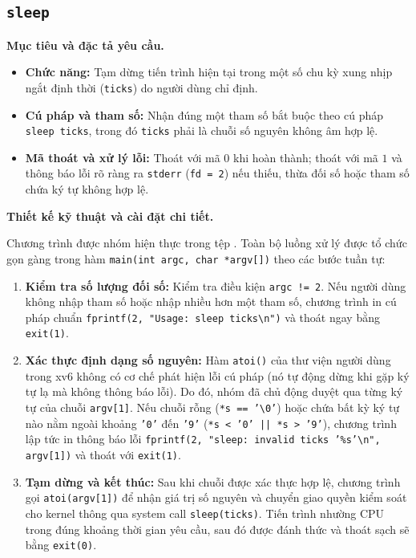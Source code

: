 \documentclass[12pt,a4paper]{article}
\begin{document}
\subsection{\texttt{sleep}}

\textbf{Mục tiêu và đặc tả yêu cầu.}
\begin{itemize}
  \item \textbf{Chức năng:} Tạm dừng tiến trình hiện tại trong một số chu kỳ xung nhịp ngắt định thời (\texttt{ticks}) do người dùng chỉ định.
  \item \textbf{Cú pháp và tham số:} Nhận đúng một tham số bắt buộc theo cú pháp \texttt{sleep ticks}, trong đó \texttt{ticks} phải là chuỗi số nguyên không âm hợp lệ.
  \item \textbf{Mã thoát và xử lý lỗi:} Thoát với mã $0$ khi hoàn thành; thoát với mã $1$ và thông báo lỗi rõ ràng ra \texttt{stderr} (\texttt{fd = 2}) nếu thiếu, thừa đối số hoặc tham số chứa ký tự không hợp lệ.
\end{itemize}

\textbf{Thiết kế kỹ thuật và cài đặt chi tiết.}

Chương trình được nhóm hiện thực trong tệp . Toàn bộ luồng xử lý được tổ chức gọn gàng trong hàm \texttt{main(int argc, char *argv[])} theo các bước tuần tự:
\begin{enumerate}
  \item \textbf{Kiểm tra số lượng đối số:} Kiểm tra điều kiện \texttt{argc != 2}. Nếu người dùng không nhập tham số hoặc nhập nhiều hơn một tham số, chương trình in cú pháp chuẩn \texttt{fprintf(2, "Usage: sleep ticks\textbackslash n")} và thoát ngay bằng \texttt{exit(1)}.
  \item \textbf{Xác thực định dạng số nguyên:} Hàm \texttt{atoi()} của thư viện người dùng trong xv6 không có cơ chế phát hiện lỗi cú pháp (nó tự động dừng khi gặp ký tự lạ mà không thông báo lỗi). Do đó, nhóm đã chủ động duyệt qua từng ký tự của chuỗi \texttt{argv[1]}. Nếu chuỗi rỗng (\texttt{*s == '\textbackslash 0'}) hoặc chứa bất kỳ ký tự nào nằm ngoài khoảng \texttt{'0'} đến \texttt{'9'} (\texttt{*s < '0' || *s > '9'}), chương trình lập tức in thông báo lỗi \texttt{fprintf(2, "sleep: invalid ticks '\%s'\textbackslash n", argv[1])} và thoát với \texttt{exit(1)}.
  \item \textbf{Tạm dừng và kết thúc:} Sau khi chuỗi được xác thực hợp lệ, chương trình gọi \texttt{atoi(argv[1])} để nhận giá trị số nguyên và chuyển giao quyền kiểm soát cho kernel thông qua system call \texttt{sleep(ticks)}. Tiến trình nhường CPU trong đúng khoảng thời gian yêu cầu, sau đó được đánh thức và thoát sạch sẽ bằng \texttt{exit(0)}.
\end{enumerate}
\end{document}
